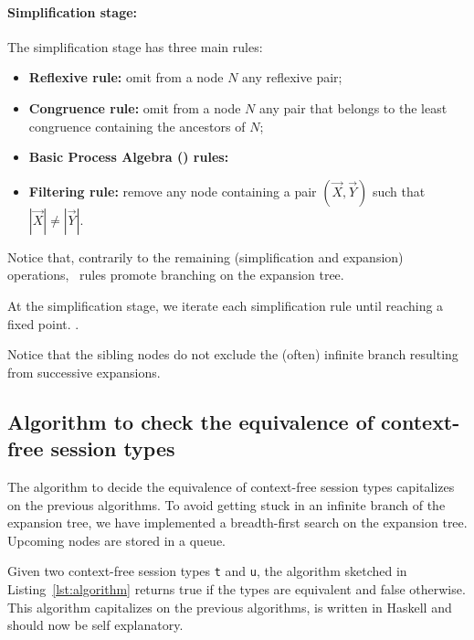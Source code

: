 \paragraph{Simplification stage:} The simplification stage has three main
 rules:
\begin{itemize}
	\item {\bf Reflexive rule:} omit from a node $N$ any reflexive pair;
	\item {\bf Congruence rule:}  omit from a node $N$ any pair that 
	      belongs to the least congruence containing the ancestors of $N$;
	\item {\bf Basic Process Algebra (\BPA) rules:} 
	\item {\bf Filtering rule:} remove any node containing a pair
	       $(\vec X, \vec Y)$ such that $|\vec X|\neq |\vec Y|$.
\end{itemize}

Notice that, contrarily to the remaining (simplification and expansion) operations, 
\BPA\ rules promote branching on the expansion tree. 

At the simplification stage, we iterate each simplification rule until reaching
a fixed point. . 

Notice that the sibling nodes do not exclude the (often) infinite branch 
resulting from successive expansions.

\subsection{Algorithm to check the equivalence of context-free session types}

The algorithm to decide the equivalence of context-free session 
types capitalizes on the previous algorithms. To avoid getting stuck in an 
infinite branch of the expansion tree, we have implemented 
a breadth-first search on the expansion tree. Upcoming nodes are stored
in a queue.

Given two context-free session types \lstinline|t| and \lstinline|u|,
the algorithm sketched in Listing~\ref{lst:algorithm} returns \textsf{true}
if the types are equivalent and \textsf{false} otherwise. 
This algorithm capitalizes on the previous algorithms, is written in Haskell 
and should now be self explanatory.

